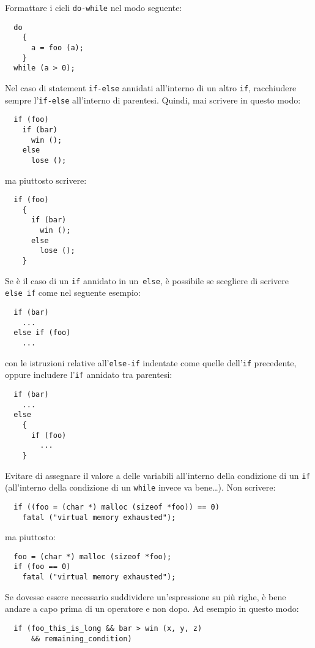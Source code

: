 \smallskip
Formattare i cicli \texttt{do-while} nel modo seguente:
\begin{lstlisting}
  do
    {
      a = foo (a);
    }
  while (a > 0);
\end{lstlisting}

\smallskip
Nel caso di  statement \texttt{if-else} annidati all'interno di un
altro \texttt{if}, racchiudere sempre l'\texttt{if-else} all'interno
di parentesi. Quindi, mai scrivere in questo modo:
\begin{lstlisting}
  if (foo)
    if (bar)
      win ();
    else
      lose ();
\end{lstlisting}
ma piuttosto scrivere:
\begin{lstlisting}
  if (foo)
    {
      if (bar)
        win ();
      else
        lose ();
    }
\end{lstlisting}

Se è il caso di un \texttt{if} annidato in un~\texttt{else}, è
possibile se scegliere di scrivere \texttt{else~if} come nel seguente
esempio:
\begin{lstlisting}
  if (bar)
    ...
  else if (foo)
    ...
\end{lstlisting}
con le istruzioni relative all'\texttt{else-if} indentate come quelle
dell'\texttt{if} precedente, oppure includere l'\texttt{if} annidato
tra parentesi:
\begin{lstlisting}
  if (bar)
    ...
  else 
    {
      if (foo)
        ... 
    }
\end{lstlisting}

\smallskip
Evitare di assegnare il valore a delle variabili all'interno della
condizione di un \texttt{if} (all'interno della condizione di un
\texttt{while} invece va bene\ldots). Non scrivere:
\begin{lstlisting}
  if ((foo = (char *) malloc (sizeof *foo)) == 0)
    fatal ("virtual memory exhausted");
\end{lstlisting}
ma piuttosto:
\begin{lstlisting}
  foo = (char *) malloc (sizeof *foo);
  if (foo == 0)
    fatal ("virtual memory exhausted");
\end{lstlisting}

\smallskip
Se dovesse essere necessario suddividere un'espressione su più righe,
è bene andare a capo prima di un operatore e non dopo. Ad esempio in
questo modo:
\begin{lstlisting}
  if (foo_this_is_long && bar > win (x, y, z)
      && remaining_condition)
\end{lstlisting}






